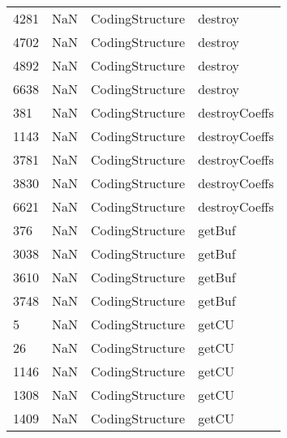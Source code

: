 \begin{tabular}{llll}
4281 &                   NaN &            CodingStructure &                                   destroy \\
4702 &                   NaN &            CodingStructure &                                   destroy \\
4892 &                   NaN &            CodingStructure &                                   destroy \\
6638 &                   NaN &            CodingStructure &                                   destroy \\
381  &                   NaN &            CodingStructure &                             destroyCoeffs \\
1143 &                   NaN &            CodingStructure &                             destroyCoeffs \\
3781 &                   NaN &            CodingStructure &                             destroyCoeffs \\
3830 &                   NaN &            CodingStructure &                             destroyCoeffs \\
6621 &                   NaN &            CodingStructure &                             destroyCoeffs \\
376  &                   NaN &            CodingStructure &                                    getBuf \\
3038 &                   NaN &            CodingStructure &                                    getBuf \\
3610 &                   NaN &            CodingStructure &                                    getBuf \\
3748 &                   NaN &            CodingStructure &                                    getBuf \\
5    &                   NaN &            CodingStructure &                                     getCU \\
26   &                   NaN &            CodingStructure &                                     getCU \\
1146 &                   NaN &            CodingStructure &                                     getCU \\
1308 &                   NaN &            CodingStructure &                                     getCU \\
1409 &                   NaN &            CodingStructure &                                     getCU \\

\end{tabular}
